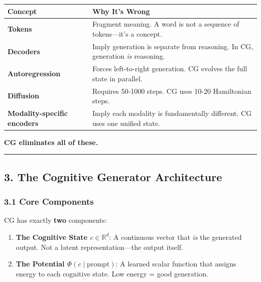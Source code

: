 \documentclass[
  11pt,
  a4paper,
]{article}
\begin{document}
\begin{longtable}[]{@{}
  >{\raggedright\arraybackslash}p{}
  >{\raggedright\arraybackslash}p{}@{}}
\toprule\noalign{}
\begin{minipage}[b]{\linewidth}\raggedright
Concept
\end{minipage} & \begin{minipage}[b]{\linewidth}\raggedright
Why It's Wrong
\end{minipage} \\
\midrule\noalign{}
\endhead
\bottomrule\noalign{}
\endlastfoot
\textbf{Tokens} & Fragment meaning. A word is not a sequence of
tokens---it's a concept. \\
\textbf{Decoders} & Imply generation is separate from reasoning. In CG,
generation \emph{is} reasoning. \\
\textbf{Autoregression} & Forces left-to-right generation. CG evolves
the full state in parallel. \\
\textbf{Diffusion} & Requires 50-1000 steps. CG uses 10-20 Hamiltonian
steps. \\
\textbf{Modality-specific encoders} & Imply each modality is
fundamentally different. CG uses one unified state. \\
\end{longtable}

\textbf{CG eliminates all of these.}

\begin{center}\rule{0.5\linewidth}{0.5pt}\end{center}

\subsection{3. The Cognitive Generator
Architecture}\label{the-cognitive-generator-architecture}

\subsubsection{3.1 Core Components}\label{core-components}

CG has exactly \textbf{two} components:

\begin{enumerate}
\def\labelenumi{\arabic{enumi}.}
\item
  \textbf{The Cognitive State \(c \in \mathbb{R}^d\)}: A continuous
  vector that \emph{is} the generated output. Not a latent
  representation---the output itself.
\item
  \textbf{The Potential \(\Phi(c \mid \text{prompt})\)}: A learned
  scalar function that assigns energy to each cognitive state. Low
  energy = good generation.
\end{enumerate}
\end{document}
